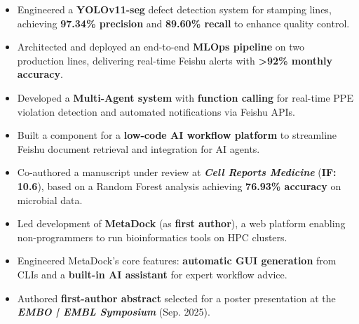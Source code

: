 \documentclass{resume}
\begin{document}
\begin{itemize}
    \item Engineered a \textbf{YOLOv11-seg} defect detection system for stamping lines, achieving \textbf{97.34\% precision} and \textbf{89.60\% recall} to enhance quality control.
    \item Architected and deployed an end-to-end \textbf{MLOps pipeline} on two production lines, delivering real-time Feishu alerts with \textbf{>92\% monthly accuracy}.
    \item Developed a \textbf{Multi-Agent system} with \textbf{function calling} for real-time PPE violation detection and automated notifications via Feishu APIs.
    \item Built a component for a \textbf{low-code AI workflow platform} to streamline Feishu document retrieval and integration for AI agents.
\end{itemize}

\begin{itemize}
    \item Co-authored a manuscript under review at \textbf{\textit{Cell Reports Medicine}} (\textbf{IF: 10.6}), based on a Random Forest analysis achieving \textbf{76.93\% accuracy} on microbial data.
    \item Led development of \textbf{MetaDock} (as \textbf{first author}), a web platform enabling non-programmers to run bioinformatics tools on HPC clusters.
    \item Engineered MetaDock's core features: \textbf{automatic GUI generation} from CLIs and a \textbf{built-in AI assistant} for expert workflow advice.
    \item Authored \textbf{first-author abstract} selected for a poster presentation at the \textbf{\textit{EMBO | EMBL Symposium}} (Sep. 2025).
\end{itemize}

\end{document}

